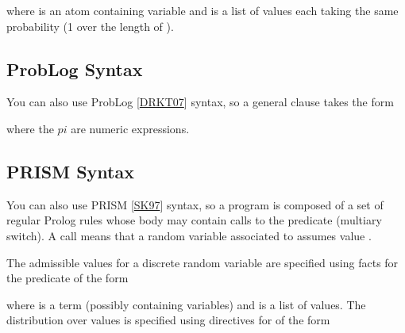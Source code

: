 \documentclass[letterpaper,10pt,english]{sphinxmanual}
\begin{document}
\sphinxAtStartPar
where  is an atom containing variable  and  is a list of values each taking the same probability (1 over the length of ).


\subsection{ProbLog Syntax}
\label{\detokenize{index:problog-syntax}}
\sphinxAtStartPar
You can also use ProbLog {[}\hyperlink{cite.index:id46}{DRKT07}{]} syntax, so a general clause takes the form

\begin{sphinxVerbatim}[commandchars=\\\{\}]
      
\end{sphinxVerbatim}

\sphinxAtStartPar
where the \(pi\) are numeric expressions.


\subsection{PRISM Syntax}
\label{\detokenize{index:prism-syntax}}
\sphinxAtStartPar
You can also use PRISM {[}\hyperlink{cite.index:id47}{SK97}{]} syntax, so a program is composed of a set of regular Prolog rules whose body may contain calls to the  predicate (multi\sphinxhyphen{}ary switch).
A call  means that a random variable associated to  assumes value .

\sphinxAtStartPar
The admissible values for a discrete random variable are specified using facts for the  predicate
of the form

\begin{sphinxVerbatim}[commandchars=\\\{\}]
\end{sphinxVerbatim}

\sphinxAtStartPar
where  is a term (possibly containing variables) and  is a list of values.
The distribution over values is specified using directives for  of the form
\end{document}
